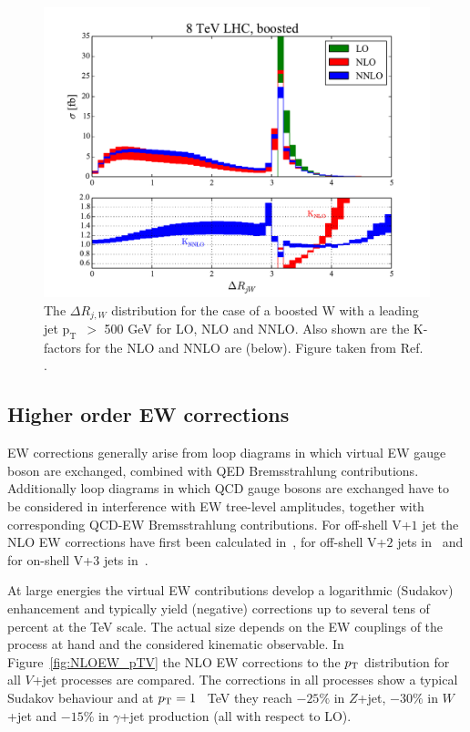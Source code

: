\documentclass[a4paper,11pt,notoc]{article}
\newcommand{\pt}{\ensuremath{\mathrm{p_T}}}
\begin{document}
\begin{figure}[t!]
\centering
\includegraphics[width=0.495\columnwidth]{delrjW.pdf} 
\caption{The $\Delta R_{j,W}$ distribution for the case of a boosted W with a leading jet \pt\ $>$ 500 GeV for LO, NLO and NNLO. Also shown are the K-factors for the NLO and NNLO are (below). Figure taken from Ref. \cite{Boughezal:2016dtm}.}
\label{fig:collinearW}
\end{figure}   





\subsection{Higher order EW corrections}

EW corrections generally arise from loop diagrams in which virtual EW gauge boson are exchanged,
combined with QED Bremsstrahlung contributions. Additionally loop diagrams in which QCD gauge bosons are exchanged have to be considered in interference with EW tree-level amplitudes, together with corresponding QCD-EW Bremsstrahlung contributions.
For off-shell V+$1$ jet the NLO EW corrections have first been calculated in~\cite{Denner:2009gj,Denner:2011vu,Denner:2012ts}, for off-shell V+$2$ jets in~\cite{Denner:2014ina,Kallweit:2015dum} and for on-shell V+$3$ jets in~\cite{Kallweit:2014xda}.


At large energies the virtual EW contributions 
develop a logarithmic (Sudakov) enhancement and typically yield (negative) corrections up to several tens of percent at the TeV scale. The actual size depends on the EW couplings of the process at hand and the considered kinematic observable. In Figure~\ref{fig:NLOEW_pTV} the NLO EW corrections to the $p_{\rm T}$ distribution for all $V$+jet processes are compared. The corrections in all processes show a typical Sudakov behaviour and at $p_{\rm T}=1$~ TeV they reach $-25\%$ in $Z$+jet, $-30\%$ in $W$+jet and $-15\%$ in $\gamma$+jet production (all with respect to LO). 
\end{document}
